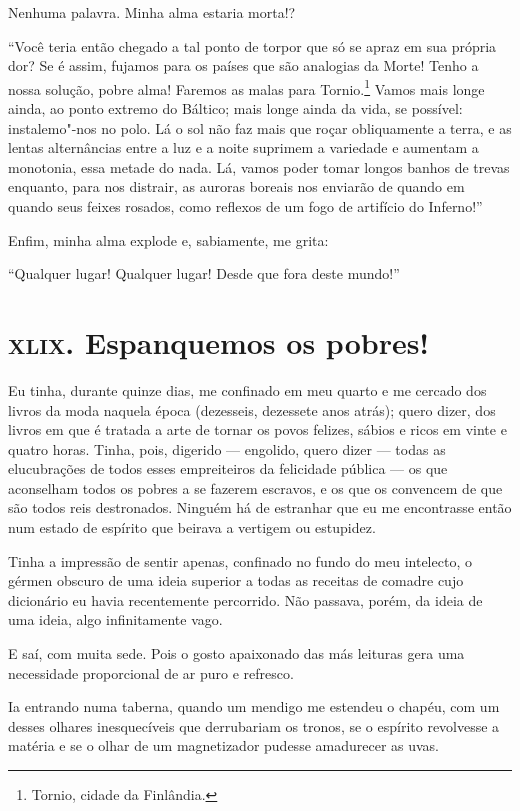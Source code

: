 Nenhuma palavra. Minha alma estaria morta!?

“Você teria então chegado a tal ponto de torpor que só se
apraz em sua própria dor? Se é assim, fujamos para os países que são
analogias da Morte! Tenho a nossa solução, pobre alma! Faremos as
malas para Tornio.\footnote{  Tornio, cidade da Finlândia.} Vamos mais longe ainda, ao ponto
extremo do Báltico; mais longe ainda da vida, se possível:
instalemo"-nos no polo. Lá o sol não faz mais que roçar obliquamente a terra, e as
lentas alternâncias entre a luz e a noite suprimem a variedade e aumentam a
monotonia, essa metade do nada. Lá, vamos poder tomar longos banhos de
trevas enquanto, para nos distrair, as auroras boreais nos
enviarão de quando em quando seus feixes rosados, como reflexos de um fogo
de artifício do Inferno!''

Enfim, minha alma explode e, sabiamente, me grita:

“Qualquer lugar! Qualquer lugar! Desde que fora deste
mundo!''

\chapter{\textsc{xlix.} Espanquemos os pobres!}

Eu tinha, durante quinze dias, me confinado em meu quarto e me cercado dos
livros da moda naquela época (dezesseis, dezessete anos atrás); quero dizer, dos
livros em que é tratada a arte de tornar os povos felizes, sábios e
ricos em vinte e quatro horas. Tinha, pois, digerido --- engolido,
quero dizer --- todas as elucubrações de todos esses empreiteiros da
felicidade pública --- os que aconselham todos os pobres a se
fazerem escravos, e os que os convencem de que são todos reis
destronados. Ninguém há de estranhar que eu me encontrasse então num
estado de espírito que beirava a vertigem ou estupidez.

Tinha a impressão de sentir apenas, confinado no fundo do meu intelecto, o
gérmen obscuro de uma ideia superior a todas as receitas de comadre 
cujo dicionário eu havia recentemente percorrido. Não passava, porém, da 
ideia de uma ideia, algo infinitamente vago.

E saí, com muita sede. Pois o gosto apaixonado das más leituras gera
uma necessidade proporcional de ar puro e refresco.

Ia entrando numa taberna, quando um mendigo me estendeu o chapéu, com
um desses olhares inesquecíveis que derrubariam os tronos, se o
espírito revolvesse a matéria e se o olhar de um magnetizador pudesse
amadurecer as uvas.

